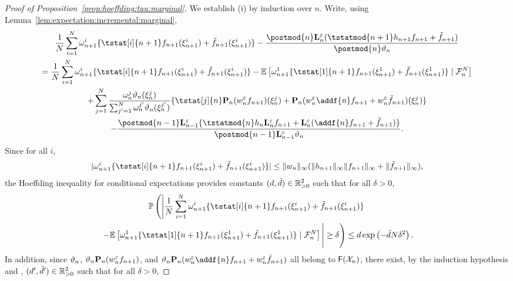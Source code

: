 \begin{proof}[Proof of Proposition~\ref{prop:hoeffding:tau:marginal}]
We establish (i) by induction over $n$. Write, using Lemma~\ref{lem:expectation:incremental:marginal},
\begin{multline} \label{eq:hoeffding:decomp}
\frac{1}{\N} \sum_{i = 1}^\N \ewght{n + 1}{i} \{\tstat[i]{n + 1} f_{n + 1}(\epart{n + 1}{i}) + \ftd{n + 1}(\epart{n + 1}{i})\} - \frac{\postmod{n} \ukmod{n} (\tstatmod{n + 1} h_{n + 1} f_{n + 1} + \ftd{n + 1})}{\postmod{n} \adjfuncforward{n}}  \\
= \frac{1}{\N} \sum_{i = 1}^\N \ewght{n + 1}{i} \{\tstat[i]{n + 1} f_{n + 1}(\epart{n + 1}{i}) + \ftd{n + 1}(\epart{n + 1}{i})\} - \pE \left[ \ewght{n + 1}{1} \{\tstat[1]{n + 1} f_{n + 1}(\epart{n + 1}{1}) + \ftd{n + 1}(\epart{n + 1}{1})\} \cond \calF{n}{\N} \right] \\
+ \sum_{j = 1}^\N 
\frac{\ewght{n}{j} \adjfuncforward{n}(\epart{n}{j})}{\sum_{j' = 1}^\N \ewght{n}{j'} \adjfuncforward{n}(\epart{n}{j'})} \{ \tstat[j]{n} \prop{n} (\wgtfuncmod{n} f_{n + 1})(\epart{n}{j}) + \prop{n}(\wgtfuncmod{n} \addf{n} f_{n + 1} + \wgtfuncmod{n} \ftd{n + 1})(\epart{n}{j})\} \\
- \frac{\postmod{n - 1} \ukmod{n - 1}\{\tstatmod{n} h_n \ukmod{n} f_{n + 1} + \ukmod{n} (\addf{n} f_{n + 1} + \ftd{n + 1})\}}{\postmod{n - 1} \ukmod{n - 1} \adjfuncforward{n}}. 
\end{multline}
Since for all $i$, 
$$
|\ewght{n + 1}{i} \{\tstat[i]{n + 1} f_{n + 1}(\epart{n + 1}{i}) + \ftd{n + 1}(\epart{n + 1}{i})\}| \leq \| \wgtfunc{n} \|_\infty (\| h_{n + 1} \|_\infty \| f_{n + 1} \|_\infty + \| \ftd{n + 1} \|_\infty), 
$$
the Hoeffding inequality for conditional expectations provides constants $(d, \tilde{d}) \in \mathbb{R}_{> 0}^2$ such that for all $\delta > 0$, 
\begin{multline*}
\pP \left( \left| \frac{1}{\N} \sum_{i = 1}^\N \ewght{n + 1}{i} \{\tstat[i]{n + 1} f_{n + 1}(\epart{n + 1}{i}) + \ftd{n + 1}(\epart{n + 1}{i})\} \right. \right. \\
\left. \left.  - \pE \left[ \ewght{n + 1}{1} \{\tstat[1]{n + 1} f_{n + 1}(\epart{n + 1}{1}) + \ftd{n + 1}(\epart{n + 1}{1})\} \cond \calF{n}{\N} \right] \vphantom{\sum_{i = 1}^\N} \right| \geq \delta \right) \leq d \exp \left( - \tilde{d} N \delta^2 \right).  
\end{multline*}
In addition, since $\vartheta_{n}$, $\vartheta_{n} \mathbf{P}_{n} (w^{\varepsilon}_{n} f_{n + 1})$, and $\adjfuncforward{n} \prop{n}(\wgtfuncmod{n} \addf{n} f_{n + 1} + \wgtfuncmod{n} \ftd{n + 1})$ all belong to $\mathsf{F}(\mathcal{X}_n)$, there exist, by the induction hypothesis and \cite[Lemma~4]{douc:garivier:moulines:olsson:2010}, $(d', \tilde{d}') \in \mathbb{R}_{> 0}^2$ such that for all $\delta > 0$, 

\end{proof}
